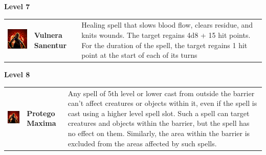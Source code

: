 \textbf{Level 7} 
\begin{tabular}{ m{4cm}m{3cm}m{6cm} } 
	\includegraphics[width=4cm]{../Pictures/Gameplay/Spells/Icon/spell_icon.png} & \textbf{Vulnera Sanentur} & Healing spell that slows blood flow, clears residue, and knits wounds. The target regains 4d8 + 15 hit points. For the duration of the spell, the target regains 1 hit point at the start of each of its turns  \\ 
\end{tabular}
\textbf{Level 8} 
\begin{tabular}{ m{4cm}m{3cm}m{6cm} } 
	\includegraphics[width=4cm]{../Pictures/Gameplay/Spells/Icon/spell_icon.png} & \textbf{Protego Maxima} & Any spell of 5th level or lower cast from outside the barrier can't affect creatures or objects within it, even if the spell is cast using a higher level spell slot. Such a spell can target creatures and objects within the barrier, but the spell has no effect on them. Similarly, the area within the barrier is excluded from the areas affected by such spells. \\ 
\end{tabular}


